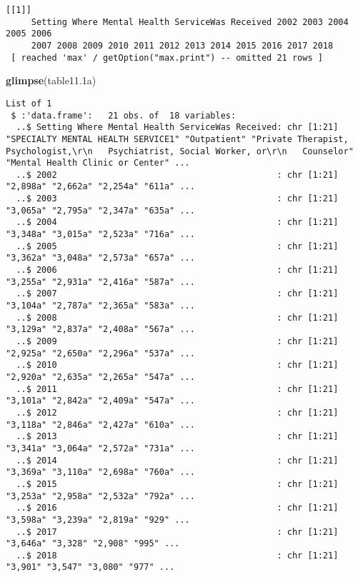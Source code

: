 \documentclass[
]{article}
\newenvironment{Shaded}{\begin{snugshade}}{\end{snugshade}}
\newcommand{\FloatTok}[1]{\textcolor[rgb]{0.00,0.00,0.81}{#1}}
\newcommand{\KeywordTok}[1]{\textcolor[rgb]{0.13,0.29,0.53}{\textbf{#1}}}
\newcommand{\NormalTok}[1]{#1}
\begin{document}
\begin{verbatim}
[[1]]
     Setting Where Mental Health ServiceWas Received 2002 2003 2004 2005 2006
     2007 2008 2009 2010 2011 2012 2013 2014 2015 2016 2017 2018
 [ reached 'max' / getOption("max.print") -- omitted 21 rows ]
\end{verbatim}

\begin{Shaded}
\begin{Highlighting}[]
\KeywordTok{glimpse}\NormalTok{(table11}\FloatTok{.1}\NormalTok{a)}
\end{Highlighting}
\end{Shaded}

\begin{verbatim}
List of 1
 $ :'data.frame':   21 obs. of  18 variables:
  ..$ Setting Where Mental Health ServiceWas Received: chr [1:21] "SPECIALTY MENTAL HEALTH SERVICE1" "Outpatient" "Private Therapist, Psychologist,\r\n   Psychiatrist, Social Worker, or\r\n   Counselor" "Mental Health Clinic or Center" ...
  ..$ 2002                                           : chr [1:21] "2,898a" "2,662a" "2,254a" "611a" ...
  ..$ 2003                                           : chr [1:21] "3,065a" "2,795a" "2,347a" "635a" ...
  ..$ 2004                                           : chr [1:21] "3,348a" "3,015a" "2,523a" "716a" ...
  ..$ 2005                                           : chr [1:21] "3,362a" "3,048a" "2,573a" "657a" ...
  ..$ 2006                                           : chr [1:21] "3,255a" "2,931a" "2,416a" "587a" ...
  ..$ 2007                                           : chr [1:21] "3,104a" "2,787a" "2,365a" "583a" ...
  ..$ 2008                                           : chr [1:21] "3,129a" "2,837a" "2,408a" "567a" ...
  ..$ 2009                                           : chr [1:21] "2,925a" "2,650a" "2,296a" "537a" ...
  ..$ 2010                                           : chr [1:21] "2,920a" "2,635a" "2,265a" "547a" ...
  ..$ 2011                                           : chr [1:21] "3,101a" "2,842a" "2,409a" "547a" ...
  ..$ 2012                                           : chr [1:21] "3,118a" "2,846a" "2,427a" "610a" ...
  ..$ 2013                                           : chr [1:21] "3,341a" "3,064a" "2,572a" "731a" ...
  ..$ 2014                                           : chr [1:21] "3,369a" "3,110a" "2,698a" "760a" ...
  ..$ 2015                                           : chr [1:21] "3,253a" "2,958a" "2,532a" "792a" ...
  ..$ 2016                                           : chr [1:21] "3,598a" "3,239a" "2,819a" "929" ...
  ..$ 2017                                           : chr [1:21] "3,646a" "3,328" "2,908" "995" ...
  ..$ 2018                                           : chr [1:21] "3,901" "3,547" "3,080" "977" ...
\end{verbatim}
\end{document}
